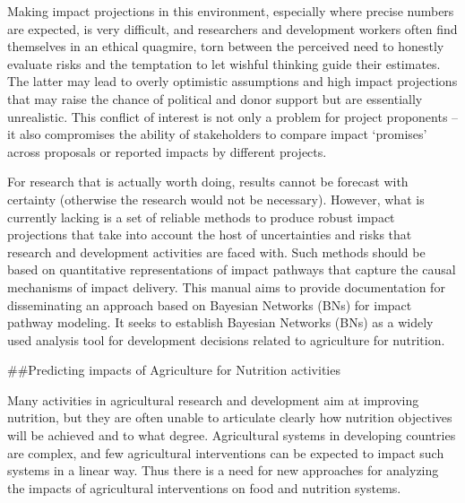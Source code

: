 \documentclass[
]{article}
\begin{document}
Making impact projections in this environment, especially where precise
numbers are expected, is very difficult, and researchers and development
workers often find themselves in an ethical quagmire, torn between the
perceived need to honestly evaluate risks and the temptation to let
wishful thinking guide their estimates. The latter may lead to overly
optimistic assumptions and high impact projections that may raise the
chance of political and donor support but are essentially unrealistic.
This conflict of interest is not only a problem for project proponents
-- it also compromises the ability of stakeholders to compare impact
`promises' across proposals or reported impacts by different projects.

For research that is actually worth doing, results cannot be forecast
with certainty (otherwise the research would not be necessary). However,
what is currently lacking is a set of reliable methods to produce robust
impact projections that take into account the host of uncertainties and
risks that research and development activities are faced with. Such
methods should be based on quantitative representations of impact
pathways that capture the causal mechanisms of impact delivery. This
manual aims to provide documentation for disseminating an approach based
on Bayesian Networks (BNs) for impact pathway modeling. It seeks to
establish Bayesian Networks (BNs) as a widely used analysis tool for
development decisions related to agriculture for nutrition.

\#\#Predicting impacts of Agriculture for Nutrition activities

Many activities in agricultural research and development aim at
improving nutrition, but they are often unable to articulate clearly how
nutrition objectives will be achieved and to what degree. Agricultural
systems in developing countries are complex, and few agricultural
interventions can be expected to impact such systems in a linear way.
Thus there is a need for new approaches for analyzing the impacts of
agricultural interventions on food and nutrition systems.
\end{document}
